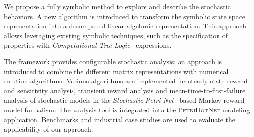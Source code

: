 We propose a fully symbolic method to explore and describe the
stochastic behaviors. A new algorithm is introduced to transform the
symbolic state space representation into a decomposed linear algebraic
representation. This approach allows leveraging existing symbolic
techniques, such as the specification of properties with
\emph{Computational Tree Logic}~ expressions.

The framework provides configurable stochastic analysis: an approach
is introduced to combine the different matrix representations with
numerical solution algorithms. Various algorithms are implemented for
steady-state reward and sensitivity analysis, transient reward
analysis and mean-time-to-first-failure analysis of stochastic models
in the \emph{Stochastic Petri Net}~ based Markov reward
model formalism. The analysis tool is integrated into the \textsc{PetriDotNet}
modeling application.  Benchmarks and industrial case studies are used
to evaluate the applicability of our approach.
